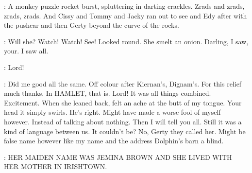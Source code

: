 :
A monkey puzzle rocket burst, spluttering in darting crackles. Zrads
and zrads, zrads, zrads. And Cissy and Tommy and Jacky ran out to see
and Edy after with the pushcar and then Gerty beyond the curve of the
rocks.

\Bloom:
Will she? Watch! Watch! See! Looked round. She smelt an onion.
Darling, I saw, your. I saw all.

\Bloom:
Lord!

\Bloom:
Did me good all the same. Off colour after Kiernan's, Dignam's. For
this relief much thanks. In HAMLET, that is. Lord! It was all things
combined. Excitement. When she leaned back, felt an ache at the butt of my
tongue. Your head it simply swirls. He's right. Might have made a worse
fool of myself however. Instead of talking about nothing. Then I will tell
you all. Still it was a kind of language between us. It couldn't be? No,
Gerty they called her. Might be false name however like my name and the
address Dolphin's barn a blind.


:
   HER MAIDEN NAME WAS JEMINA BROWN
    AND SHE LIVED WITH HER MOTHER IN IRISHTOWN.


